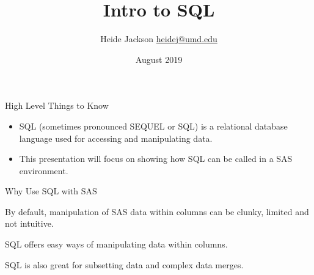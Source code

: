 \documentclass{beamer}
\title{Intro to SQL}
\author{\texorpdfstring{Heide Jackson \newline\url{heidej@umd.edu}}{Author}}
\institute{University of Maryland Population Research Center}
\date{August 2019}
\begin{document}
\maketitle
\begin{frame}{High Level Things to Know}
\begin{itemize}
\item SQL (sometimes pronounced SEQUEL or SQL) is a relational database language used for accessing and manipulating data.
\item This presentation will focus on showing how SQL can be called in a SAS environment.
\end{itemize}
\end{frame}


\begin{frame}[fragile]{Why Use SQL with SAS}

\begin{item}
\item By default, manipulation of SAS data within columns can be clunky, limited and not intuitive.
\item SQL offers easy ways of manipulating data within columns.
\item SQL is also great for subsetting data and complex data merges.
\end{item}
\end{frame}
\end{document}
